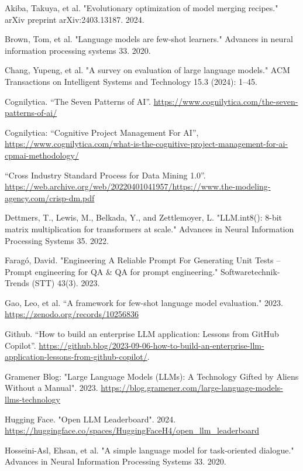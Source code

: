 \documentclass[twocolumn]{article}
\begin{document}
\small
\begin{thebibliography}{99}
 Akiba, Takuya, et al. "Evolutionary optimization of model merging recipes." arXiv preprint arXiv:2403.13187. 2024.

 Brown, Tom, et al. "Language models are few-shot learners." Advances in neural information processing systems 33. 2020.

 Chang, Yupeng, et al. "A survey on evaluation of large language models." ACM Transactions on Intelligent Systems and Technology 15.3 (2024): 1--45.

 Cognilytica. “The Seven Patterns of AI”. \url{https://www.cognilytica.com/the-seven-patterns-of-ai/}

 Cognilytica: “Cognitive Project Management For AI”, \url{https://www.cognilytica.com/what-is-the-cognitive-project-management-for-ai-cpmai-methodology/}

 “Cross Industry Standard Process for Data Mining 1.0”. \url{https://web.archive.org/web/20220401041957/https://www.the-modeling-agency.com/crisp-dm.pdf}

 Dettmers, T., Lewis, M., Belkada, Y., and Zettlemoyer, L. "LLM.int8(): 8-bit matrix multiplication for transformers at scale." Advances in Neural Information Processing Systems 35. 2022.

 Faragó, David. "Engineering A Reliable Prompt For Generating Unit Tests -- Prompt engineering for QA \& QA for prompt engineering." Softwaretechnik-Trends (STT) 43(3). 2023.

 Gao, Leo, et al. “A framework for few-shot language model evaluation." 2023. \url{https://zenodo.org/records/10256836}

 Github. “How to build an enterprise LLM application: Lessons from GitHub Copilot”. \url{https://github.blog/2023-09-06-how-to-build-an-enterprise-llm-application-lessons-from-github-copilot/}.

 Gramener Blog: "Large Language Models (LLMs): A Technology Gifted by Aliens Without a Manual". 2023. \url{https://blog.gramener.com/large-language-models-llms-technology}

 Hugging Face. "Open LLM Leaderboard". 2024. \url{https://huggingface.co/spaces/HuggingFaceH4/open_llm_leaderboard}

 Hosseini-Asl, Ehsan, et al. "A simple language model for task-oriented dialogue." Advances in Neural Information Processing Systems 33. 2020.


\end{thebibliography}
\end{document}
